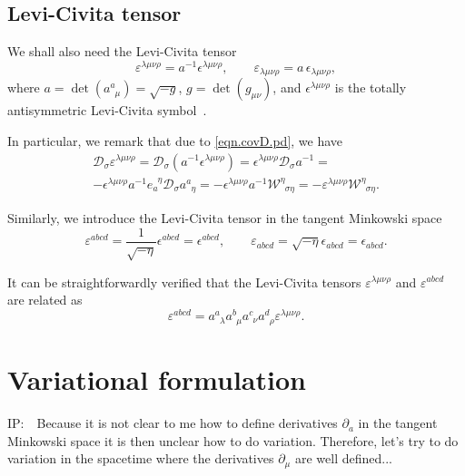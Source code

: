 \documentclass[
10pt, %
a4paper, %
oneside, %
headinclude,footinclude, %
BCOR5mm, %
]{scrartcl}
\newcommand{\IP}[1]{{\color{Red}IP:\ \ #1}}
\newcommand{\pd}{\partial}
\newcommand{\itetr}[2]{e^{\phantom{#2}#1}_{#2}}
\newcommand{\tetr}[2]{a^{#1}_{\phantom{#1}#2}}
\newcommand{\D}[1]{\mathcal{D}_{#1}} %
\newcommand{\W}[2]{\mathcal{W}^{#1}_{\phantom{#1}#2}}
\newcommand{\veps}{\varepsilon}
\begin{document}
\subsection{Levi-Civita tensor}
We shall also need the Levi-Civita tensor
\begin{equation}\label{def.LeviCivita}
\veps^{\lambda\mu\nu\rho} = a^{-1} \epsilon^{\lambda\mu\nu\rho}, \qquad \veps_{\lambda\mu\nu\rho} = 
a \, \epsilon_{\lambda\mu\nu\rho},
\end{equation}
where $ a = \det(\tetr{a}{\mu}) = \sqrt{-g}$, $ g = \det(g_{\mu\nu}) $, and $ 
\epsilon^{{\lambda\mu\nu\rho}} $ is the totally antisymmetric Levi-Civita 
symbol~\cite{AldrovandiPereiraBook}.


In particular, we remark that due to \eqref{eqn.covD.pd}, we have
\begin{multline}\label{eqn.diff.LeviCivita}
\D{\sigma}\veps^{\lambda\mu\nu\rho} = \D{\sigma}(a^{-1}\epsilon^{\lambda\mu\nu\rho}) = 
\epsilon^{\lambda\mu\nu\rho}\D{\sigma}a^{-1} = 
\\
-\epsilon^{\lambda\mu\nu\rho}a^{-1}\itetr{\eta}{a}\D{\sigma}\tetr{a}{\eta} = 
-\epsilon^{\lambda\mu\nu\rho}a^{-1}\W{\eta}{\sigma\eta} = 
-\veps^{\lambda\mu\nu\rho}\W{\eta}{\sigma\eta} . 
\end{multline}

Similarly, we introduce the Levi-Civita tensor in the tangent Minkowski space
\begin{equation}
\veps^{abcd} =\frac{1}{ \sqrt{-\eta}}\epsilon^{abcd} = \epsilon^{abcd}, \qquad \veps_{abcd} = 
\sqrt{-\eta}\epsilon_{abcd} = \epsilon_{abcd}.
\end{equation}

It can be straightforwardly verified that the Levi-Civita tensors $ \veps^{\lambda\mu\nu\rho} $ and 
$ \veps^{abcd} $ are 
related as
\begin{equation}
\veps^{abcd} = \tetr{a}{\lambda}\tetr{b}{\mu}\tetr{c}{\nu}\tetr{d}{\rho}\veps^{\lambda\mu\nu\rho}.
\end{equation}


\section{Variational formulation}

\IP{Because it is not clear to me how to define derivatives $ \pd_a $ in the tangent Minkowski 
space it is then unclear how to do variation. Therefore, let's try to do variation in the spacetime 
where the derivatives $ \pd_\mu $ are well defined...}
\end{document}
